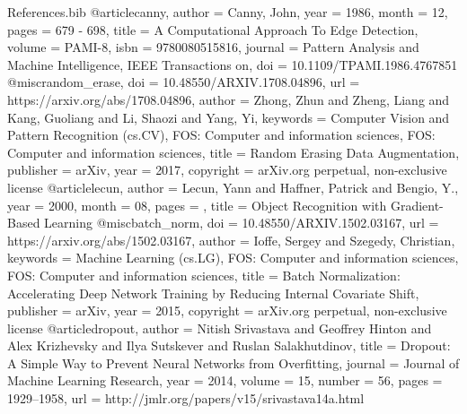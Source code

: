 \documentclass[a4paper,12pt,sort&compress]{article}
\begin{document}
\begin{filecontents}{References.bib}
    @article{canny,
        author = {Canny, John},
        year = {1986},
        month = {12},
        pages = {679 - 698},
        title = {A Computational Approach To Edge Detection},
        volume = {PAMI-8},
        isbn = {9780080515816},
        journal = {Pattern Analysis and Machine Intelligence, IEEE Transactions on},
        doi = {10.1109/TPAMI.1986.4767851}
        }
    @misc{random_erase,
        doi = {10.48550/ARXIV.1708.04896},
        url = {https://arxiv.org/abs/1708.04896},
        author = {Zhong, Zhun and Zheng, Liang and Kang, Guoliang and Li, Shaozi and Yang, Yi},
        keywords = {Computer Vision and Pattern Recognition (cs.CV), FOS: Computer and information sciences, FOS: Computer and information sciences},
        title = {Random Erasing Data Augmentation},
        publisher = {arXiv},
        year = {2017},
        copyright = {arXiv.org perpetual, non-exclusive license}
        }
    @article{lecun,
        author = {Lecun, Yann and Haffner, Patrick and Bengio, Y.},
        year = {2000},
        month = {08},
        pages = {},
        title = {Object Recognition with Gradient-Based Learning}
        }
    @misc{batch_norm,
        doi = {10.48550/ARXIV.1502.03167},
        url = {https://arxiv.org/abs/1502.03167},
        author = {Ioffe, Sergey and Szegedy, Christian},
        keywords = {Machine Learning (cs.LG), FOS: Computer and information sciences, FOS: Computer and information sciences},
        title = {Batch Normalization: Accelerating Deep Network Training by Reducing Internal Covariate Shift},
        publisher = {arXiv},
        year = {2015},
        copyright = {arXiv.org perpetual, non-exclusive license}
      }
    @article{dropout,
      author  = {Nitish Srivastava and Geoffrey Hinton and Alex Krizhevsky and Ilya Sutskever and Ruslan Salakhutdinov},
      title   = {Dropout: A Simple Way to Prevent Neural Networks from Overfitting},
      journal = {Journal of Machine Learning Research},
      year    = {2014},
      volume  = {15},
      number  = {56},
      pages   = {1929--1958},
      url     = {http://jmlr.org/papers/v15/srivastava14a.html}
    }
      



\end{filecontents}






\newpage
\end{document}
